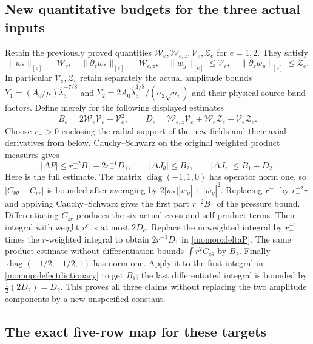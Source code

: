 \documentclass[11pt]{article}
\begin{document}
\subsection{New quantitative budgets for the three actual inputs}

Retain the previously proved quantities
$\mathcal W_e,\mathcal W_{e,z},\mathcal V_e,\mathcal Z_e$ for
$e=1,2$. They satisfy
\[
 \|w_*\|_{[e]}=\mathcal W_e,\quad
 \|\partial_zw_*\|_{[e]}=\mathcal W_{e,z},\quad
 \|w_y\|_{[e]}\le\mathcal V_e,\quad
 \|\partial_zw_y\|_{[e]}\le\mathcal Z_e.
\]
In particular $\mathcal V_e,\mathcal Z_e$ retain separately the
actual amplitude bounds
$Y_1=(A_0/\mu)\widehat\lambda_3^{-7/8}$ and
$Y_2=2A_0\widehat\lambda_3^{1/8}/(\sigma_2\sqrt{n_i})$
and their physical source-band factors. Define merely for the
following displayed estimates
\[
 B_e=2\mathcal W_e\mathcal V_e+\mathcal V_e^2,\qquad
 D_e=\mathcal W_{e,z}\mathcal V_e+
                    \mathcal W_e\mathcal Z_e+\mathcal V_e\mathcal Z_e.
\]
Choose $r_->0$ enclosing the radial support of the new fields and
their axial derivatives from below. Cauchy--Schwarz on the original
weighted product measures gives
\begin{equation}\label{momop:targetbounds}
 |\Delta P|\le r_-^{-2}B_1+2r_-^{-1}D_1,\qquad
 |\Delta J_\theta|\le B_2,\qquad
 |\Delta J_z|\le B_1+D_2.
\end{equation}
Here is the full estimate. The matrix
$\operatorname{diag}(-1,1,0)$ has operator norm one, so
$|C_{\theta\theta}-C_{rr}|$ is bounded after averaging by
$2|w_*||w_y|+|w_y|^2$. Replacing $r^{-1}$ by
$r_-^{-2}r$ and applying Cauchy--Schwarz gives the first part
$r_-^{-2}B_1$ of the pressure bound. Differentiating $C_{zr}$
produces the six actual cross and self product terms. Their integral
with weight $r^e$ is at most $2D_e$. Replace the unweighted
integral by $r_-^{-1}$ times the $r$-weighted integral to obtain
$2r_-^{-1}D_1$ in \eqref{momop:deltaP}.
The same product estimate without differentiation bounds
$\int r^2C_{z\theta}$ by $B_2$.
Finally $\operatorname{diag}(-1/2,-1/2,1)$ has norm one.
Apply it to the first integral in \eqref{momop:defectdictionary}
to get $B_1$; the last differentiated integral is bounded by
$\tfrac12(2D_2)=D_2$. This proves all three claims without
replacing the two amplitude components by a new unspecified constant.

\subsection{The exact five-row map for these targets}
\end{document}

